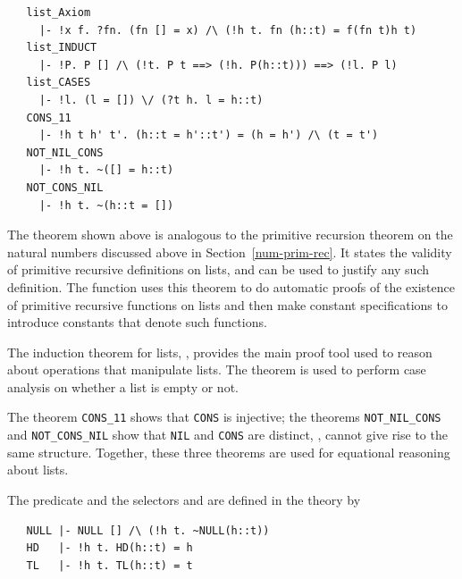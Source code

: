 \begin{hol}
\begin{verbatim}
   list_Axiom
     |- !x f. ?fn. (fn [] = x) /\ (!h t. fn (h::t) = f(fn t)h t)
   list_INDUCT
     |- !P. P [] /\ (!t. P t ==> (!h. P(h::t))) ==> (!l. P l)
   list_CASES
     |- !l. (l = []) \/ (?t h. l = h::t)
   CONS_11
     |- !h t h' t'. (h::t = h'::t') = (h = h') /\ (t = t')
   NOT_NIL_CONS
     |- !h t. ~([] = h::t)
   NOT_CONS_NIL
     |- !h t. ~(h::t = [])
\end{verbatim}
\end{hol}

The theorem  shown above is analogous to the primitive
recursion theorem
%
%
on the natural numbers discussed above in Section~\ref{num-prim-rec}.
It states the validity of primitive recursive definitions on lists,
and can be used to justify any such definition.  The \ML{} function
 uses this theorem to do
automatic
%
%
proofs of the existence of primitive recursive functions on lists and
then make constant specifications to introduce constants that denote
such functions.

The induction theorem for lists, , provides the main
proof tool used to reason about operations that manipulate lists. The
theorem  is used to perform case analysis on whether a
list is empty or not.

The theorem {\small\verb+CONS_11+} shows that {\small\verb+CONS+} is injective;
the theorems {\small\verb+NOT_NIL_CONS+} and {\small\verb+NOT_CONS_NIL+} show that
{\small\verb+NIL+} and {\small\verb+CONS+} are distinct, \ie,
cannot give rise to the same structure. Together, these three theorems
are used for equational reasoning about lists.

The predicate  and the selectors
%
%
 and  are defined in the theory  by
%
\begin{hol}
\begin{verbatim}
   NULL |- NULL [] /\ (!h t. ~NULL(h::t))
   HD   |- !h t. HD(h::t) = h
   TL   |- !h t. TL(h::t) = t
\end{verbatim}
\end{hol}

